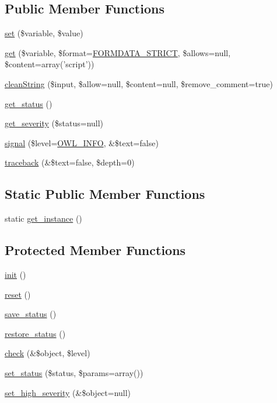 \subsection*{Public Member Functions}
\begin{DoxyCompactItemize}
\item 
\hyperlink{classFormHandler_a5fcc8aef0de87e31ceee65ad1eadb96c}{set} (\$variable, \$value)
\item 
\hyperlink{classFormHandler_a4dbeaa44aa51a795b16379ae703d893a}{get} (\$variable, \$format=\hyperlink{class_8formhandler_8php_af5de9385d7f7fc802eaa8e7090d8e0f5}{FORMDATA\_\-STRICT}, \$allows=null, \$content=array('script'))
\item 
\hyperlink{classFormHandler_a5ee0cda14dcbe0b6e12226db4bd951a0}{cleanString} (\$input, \$allow=null, \$content=null, \$remove\_\-comment=true)
\item 
\hyperlink{class__OWL_a99ec771fa2c5c279f80152cc09e489a8}{get\_\-status} ()
\item 
\hyperlink{class__OWL_adf9509ef96858be7bdd9414c5ef129aa}{get\_\-severity} (\$status=null)
\item 
\hyperlink{class__OWL_a51ba4a16409acf2a2f61f286939091a5}{signal} (\$level=\hyperlink{owl_8severitycodes_8php_a139328861128689f2f4def6a399d9057}{OWL\_\-INFO}, \&\$text=false)
\item 
\hyperlink{class__OWL_aa29547995d6741b7d2b90c1d4ea99a13}{traceback} (\&\$text=false, \$depth=0)
\end{DoxyCompactItemize}
\subsection*{Static Public Member Functions}
\begin{DoxyCompactItemize}
\item 
static \hyperlink{classFormHandler_ad5b352905583faed17034459f1a9ea6c}{get\_\-instance} ()
\end{DoxyCompactItemize}
\subsection*{Protected Member Functions}
\begin{DoxyCompactItemize}
\item 
\hyperlink{class__OWL_ae0ef3ded56e8a6b34b6461e5a721cd3e}{init} ()
\item 
\hyperlink{class__OWL_a2f2a042bcf31965194c03033df0edc9b}{reset} ()
\item 
\hyperlink{class__OWL_a9e49b9c76fbc021b244c6915ea536d71}{save\_\-status} ()
\item 
\hyperlink{class__OWL_a465eeaf40edd9f9c848841700c32ce55}{restore\_\-status} ()
\item 
\hyperlink{class__OWL_ad6f4f6946f40199dd0333cf219fa500e}{check} (\&\$object, \$level)
\item 
\hyperlink{class__OWL_aea912d0ede9b3c2a69b79072d94d4787}{set\_\-status} (\$status, \$params=array())
\item 
\hyperlink{class__OWL_a576829692a3b66e3d518853bf43abae3}{set\_\-high\_\-severity} (\&\$object=null)
\end{DoxyCompactItemize}
